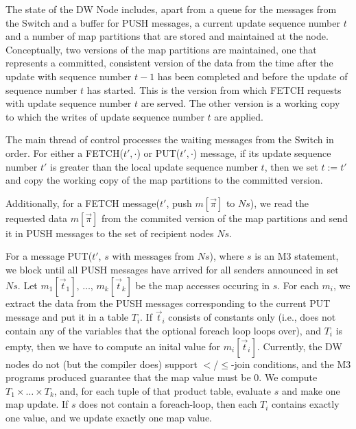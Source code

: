
The state of the DW Node includes, apart from a queue 
for the messages from the Switch and a buffer for PUSH messages, a
current update sequence number $t$ and a number
of map partitions that are stored and maintained at the node.
Conceptually, two versions of the map partitions are maintained,
one that represents a committed, consistent version of the data from the time after the
update with sequence number $t-1$ has been completed and before the update
of sequence number $t$ has started. This is the version from which FETCH
requests with update sequence number $t$ are served. The other
version is a working copy to which the writes of update sequence number
$t$ are applied.

The main thread of control processes the waiting messages from the Switch
in order.
For either a FETCH($t', \cdot$) or PUT($t', \cdot$) message, if its
update sequence number $t'$ is greater
than the local update sequence number $t$, then we set $t := t'$
and copy the working copy of the map partitions to the committed version.

Additionally,
for a FETCH message($t'$, push $m[\vec{\pi}]$ to $Ns$),
we read the requested data $m[\vec{\pi}]$ from the commited version of
the map partitions and send it in PUSH messages to the set of recipient
nodes $Ns$.

For a message PUT($t'$, $s$ with messages from $Ns$), where $s$ is an M3
statement, we block until all PUSH messages have arrived for all
senders announced in set $Ns$.
Let $m_1[\vec{t}_1]$, $\dots$, $m_k[\vec{t}_k]$ be the map accesses occuring in
$s$. For each $m_i$, 
we extract the data from the PUSH messages corresponding
to the current PUT message and put it in a table $T_i$.
If $\vec{t}_i$ consists of constants only (i.e., does not contain any
of the variables that the optional foreach loop loops over), and $T_i$ is
empty, then we have to compute an inital value for $m_i[\vec{t}_i]$.
Currently, the DW nodes do not (but the compiler does) support $<$/$\le$-join
conditions, and the M3 programs produced guarantee that the map value must be
0.  We compute
$T_1 \times \dots \times T_k$, and, for each tuple of that product table,
evaluate $s$ and make one map update.
If $s$ does not contain a foreach-loop, then each $T_i$ contains exactly
one value, and we update exactly one map value.


